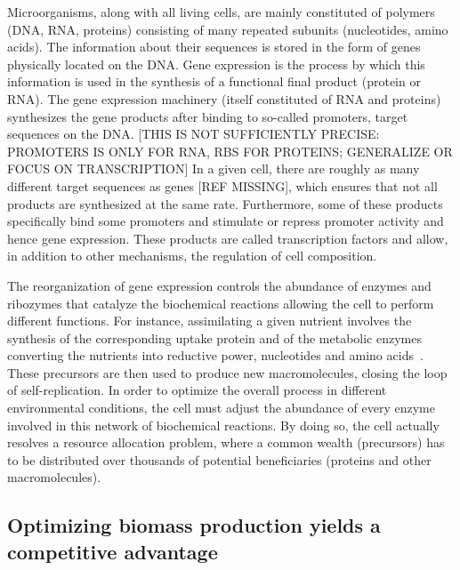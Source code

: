 Microorganisms, along with all living cells, are mainly constituted of polymers (DNA, RNA, proteins) consisting of many repeated subunits (nucleotides, amino acids).
The information about their sequences is stored in the form of genes physically located on the DNA.
Gene expression is the process by which this information is used in the synthesis of a functional final product (protein or RNA).
The gene expression machinery (itself constituted of RNA and proteins) synthesizes the gene products after binding to so-called promoters, target sequences on the DNA. [THIS IS NOT SUFFICIENTLY PRECISE: PROMOTERS IS ONLY FOR RNA, RBS FOR PROTEINS; GENERALIZE OR FOCUS ON TRANSCRIPTION]
In a given cell, there are roughly as many different target sequences as genes [REF MISSING], which ensures that not all products are synthesized at the same rate.
Furthermore, some of these products specifically bind some promoters and stimulate or repress promoter activity and hence gene expression.
These products are called transcription factors and allow, in addition to other mechanisms, the regulation of cell composition.

The reorganization of gene expression controls the abundance of enzymes and ribozymes that catalyze the biochemical reactions allowing the cell to perform different functions.
For instance, assimilating a given nutrient involves the synthesis of the corresponding uptake protein and of the metabolic enzymes converting the nutrients into reductive power, nucleotides and amino acids~\cite{schaechter_microbe_2006}.
These precursors are then used to produce new macromolecules, closing the loop of self-replication.
In order to optimize the overall process in different environmental conditions, the cell must adjust the abundance of every enzyme involved in this network of biochemical reactions.
By doing so, the cell actually resolves a resource allocation problem, where a common wealth (precursors) has to be distributed over thousands of potential beneficiaries (proteins and other macromolecules).

\subsection{Optimizing biomass production yields a competitive advantage}

